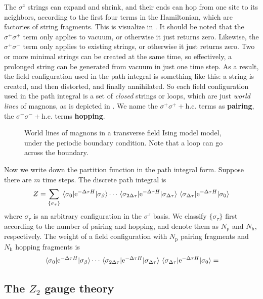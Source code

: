 \documentclass[hyperref, a4paper]{article}
\newcommand*{\ee}{\mathrm{e}}
\newcommand*{\concept}[1]{{\textbf{#1}}}
\newcommand*{\Ztwo}{$\mathbb{Z}_2$ }
\newcommand*{\tfim}{transverse field Ising model}
\def\mathbb#1{#1}%
\begin{document}
The $\sigma^z$ strings can expand and shrink, and their ends can hop from one site to its neighbors, 
according to the first four terms in the Hamiltonian, which are factories of string fragments.
This is visualize in .
It should be noted that the $\sigma^+ \sigma^+$ term only applies to vacuum, or otherwise it just returns zero.
Likewise, the $\sigma^+ \sigma^-$ term only applies to existing strings, or otherwise it just returns zero.
Two or more minimal strings can be created at the same time, 
so effectively, a prolonged string can be generated from vacuum in just one time step.
As a result, the field configuration used in the path integral is something like this: 
a string is created, and then distorted, and finally annihilated.
So each field configuration used in the path integral is a set of \emph{closed} strings or loops, 
which are just \emph{world lines} of magnons, as is depicted in .
We name the $\sigma^+ \sigma^+ + \text{h.c.}$ terms as \concept{pairing}, the $\sigma^+ \sigma^- + \text{h.c.}$ terms \concept{hopping}.

\begin{figure}
    \centering
    
    \caption{World lines of magnons in a \tfim{} model, under the periodic boundary condition. Note that a loop can go across the boundary.}
    \label{fig:tfim-worldline}
\end{figure}

Now we write down the partition function in the path integral form.
Suppose there are $m$ time steps. The discrete path integral is 
\begin{equation}
    Z = \sum_{\{\sigma_\tau\}} \mel{\sigma_0}{\ee^{-\Delta \tau H}}{\sigma_\beta} \cdots \mel{\sigma_{2\Delta \tau}}{\ee^{-\Delta \tau H}}{\sigma_{\Delta \tau}} \mel{\sigma_{\Delta \tau}}{\ee^{-\Delta \tau H}}{\sigma_{0}}  
\end{equation}
where $\sigma_\tau$ is an arbitrary configuration in the $\sigma^z$ basis.
We classify $\{\sigma_\tau\}$ first according to the number of pairing and hopping, and denote them as $N_\text{p}$ and $N_\text{h}$, respectively.
The weight of a field configuration with $N_\text{p}$ pairing fragments and $N_\text{h}$ hopping fragments is
\[
    \mel{\sigma_0}{\ee^{-\Delta \tau H}}{\sigma_\beta} \cdots \mel{\sigma_{2\Delta \tau}}{\ee^{-\Delta \tau H}}{\sigma_{\Delta \tau}} \mel{\sigma_{\Delta \tau}}{\ee^{-\Delta \tau H}}{\sigma_{0}} = 
\]

\subsection{The \Ztwo gauge theory}
\end{document}
